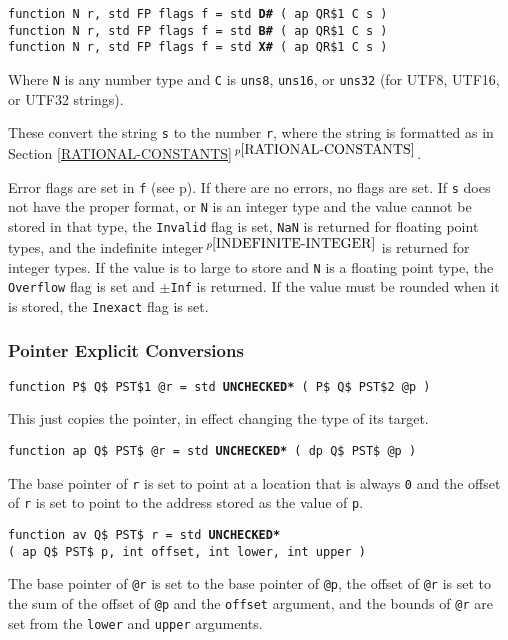 \documentclass[12pt]{article}
\newcommand{\ttkey}[1]{{\tt \bfseries #1}}
\newcommand{\itemref}[1]{\ref{#1}$\,^{p\pageref{#1}}$}
\newcommand{\pagref}[1]{p\pageref{#1}}
\newcommand{\pagnote}[1]{$\,^{p\pageref{#1}}$}
\newenvironment{indpar}[1][0.3in]%
	{\begin{list}{}%
		     {\setlength{\itemsep}{0in}%
		      \setlength{\topsep}{0in}%
		      \setlength{\parsep}{1ex}%
		      \setlength{\labelwidth}{#1}%
		      \setlength{\leftmargin}{#1}%
		      \addtolength{\leftmargin}{\labelsep}}%
	 \item}%
	{\end{list}}
\begin{document}
{\tt function N r, std FP flags f = std \ttkey{D\#} ( ap QR\$1 C s )} \\
{\tt function N r, std FP flags f = std \ttkey{B\#} ( ap QR\$1 C s )} \\
{\tt function N r, std FP flags f = std \ttkey{X\#} ( ap QR\$1 C s )}
\label{RUN-TIME-STRING-TO-NUMBER-CONVERSIONS}
\begin{indpar}
Where {\tt N} is any number type
and {\tt C} is {\tt uns8}, {\tt uns16}, or {\tt uns32} (for UTF8, UTF16,
or UTF32 strings).

These convert the string {\tt s} to the number {\tt r}, where the
string is formatted as in Section \itemref{RATIONAL-CONSTANTS}.

Error flags are set in {\tt f} (see \pagref{FP-FLAGS-DATA}).
If there are no errors, no flags are set.
If {\tt s} does not have the proper format, or {\tt N} is an integer type
and the value cannot be stored in that type,
the {\tt Invalid} flag is set, {\tt NaN} is returned for floating point types,
and the indefinite integer\pagnote{INDEFINITE-INTEGER}
is returned for integer types.
If the value is to large to store and {\tt N} is a floating point type, the
{\tt Overflow} flag is set and {\tt $\pm$Inf} is returned.
If the value must be rounded when it is stored,
the {\tt Inexact} flag is set.
\end{indpar}

\subsubsection{Pointer Explicit Conversions}

{\tt function P\$ Q\$ PST\$1 @r = std \ttkey{*UNCHECKED*} ( P\$ Q\$ PST\$2 @p )}
\begin{indpar}
This just copies the pointer, in effect changing the type of its
target.
\end{indpar}

{\tt function ap Q\$ PST\$ @r = std \ttkey{*UNCHECKED*} ( dp Q\$ PST\$ @p )}
\begin{indpar}
The base pointer of {\tt r} is set to point at a location that is
always {\tt 0} and the offset of {\tt r} is set to point to the
address stored as the value of {\tt p}.
\end{indpar}

{\tt function av Q\$ PST\$ r = std \ttkey{*UNCHECKED*} \\
\hspace*{0.2in}( ap Q\$ PST\$ p, int offset, int lower, int upper )}
\begin{indpar}
The base pointer of {\tt @r} is set to the base pointer of {\tt @p},
the offset of {\tt @r} is set to the sum of the offset of {\tt @p}
and the {\tt offset} argument, and the bounds of {\tt @r} are set from
the {\tt lower} and {\tt upper} arguments.
\end{indpar}
\end{document}
